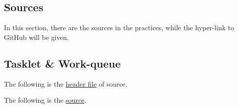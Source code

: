 \documentclass{report}
\begin{document}
    \begin{appendix}
        \chapter{Sources}
        \label{achap:source}
        
        In this section, there are the sources in the practices, while the hyper-link to GitHub will be given.
        
        \section{Tasklet \& Work-queue}
        \label{src:tnw}
        
        The following is the
        \href{https://github.com/Qinka/embedded-system-design-homework/blob/master/practice3/task.h}{header file}
        of source.
        
        
        The following is the \href{https://github.com/Qinka/embedded-system-design-homework/blob/master/practice3/task.c}{source}.
        
    \end{appendix}
    
\end{document}
